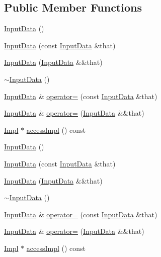 \subsection*{Public Member Functions}
\begin{DoxyCompactItemize}
\item 
\hyperlink{classMcCAD_1_1General_1_1InputData_a73842cb82b9c9992dee53ba766a5994c}{Input\+Data} ()
\item 
\hyperlink{classMcCAD_1_1General_1_1InputData_a1f1ffe8e5b1226b01da7916bdf5b59eb}{Input\+Data} (const \hyperlink{classMcCAD_1_1General_1_1InputData}{Input\+Data} \&that)
\item 
\hyperlink{classMcCAD_1_1General_1_1InputData_a04ef329c9eb848ce855faebb88f24f89}{Input\+Data} (\hyperlink{classMcCAD_1_1General_1_1InputData}{Input\+Data} \&\&that)
\item 
\hyperlink{classMcCAD_1_1General_1_1InputData_a11156f1c907e745d408926ebb09d3dd0}{$\sim$\+Input\+Data} ()
\item 
\hyperlink{classMcCAD_1_1General_1_1InputData}{Input\+Data} \& \hyperlink{classMcCAD_1_1General_1_1InputData_ae8cb358b1e230307dec893a5ec6490af}{operator=} (const \hyperlink{classMcCAD_1_1General_1_1InputData}{Input\+Data} \&that)
\item 
\hyperlink{classMcCAD_1_1General_1_1InputData}{Input\+Data} \& \hyperlink{classMcCAD_1_1General_1_1InputData_ac9d4a0a6caf1f89ed09ddbd700bcb6ae}{operator=} (\hyperlink{classMcCAD_1_1General_1_1InputData}{Input\+Data} \&\&that)
\item 
\hyperlink{classMcCAD_1_1General_1_1InputData_1_1Impl}{Impl} $\ast$ \hyperlink{classMcCAD_1_1General_1_1InputData_aefaf94de8ee1317c3db7f45da3e3b0ce}{access\+Impl} () const
\item 
\hyperlink{classMcCAD_1_1General_1_1InputData_a73842cb82b9c9992dee53ba766a5994c}{Input\+Data} ()
\item 
\hyperlink{classMcCAD_1_1General_1_1InputData_a1f1ffe8e5b1226b01da7916bdf5b59eb}{Input\+Data} (const \hyperlink{classMcCAD_1_1General_1_1InputData}{Input\+Data} \&that)
\item 
\hyperlink{classMcCAD_1_1General_1_1InputData_a04ef329c9eb848ce855faebb88f24f89}{Input\+Data} (\hyperlink{classMcCAD_1_1General_1_1InputData}{Input\+Data} \&\&that)
\item 
\hyperlink{classMcCAD_1_1General_1_1InputData_a11156f1c907e745d408926ebb09d3dd0}{$\sim$\+Input\+Data} ()
\item 
\hyperlink{classMcCAD_1_1General_1_1InputData}{Input\+Data} \& \hyperlink{classMcCAD_1_1General_1_1InputData_a19ffac929c6410bb768cc4a7630183b0}{operator=} (const \hyperlink{classMcCAD_1_1General_1_1InputData}{Input\+Data} \&that)
\item 
\hyperlink{classMcCAD_1_1General_1_1InputData}{Input\+Data} \& \hyperlink{classMcCAD_1_1General_1_1InputData_a4244ba00ba89c814c7607c4c7fd9fc91}{operator=} (\hyperlink{classMcCAD_1_1General_1_1InputData}{Input\+Data} \&\&that)
\item 
\hyperlink{classMcCAD_1_1General_1_1InputData_1_1Impl}{Impl} $\ast$ \hyperlink{classMcCAD_1_1General_1_1InputData_aeb2134f5c5d789ce81f1975a93c0e642}{access\+Impl} () const
\end{DoxyCompactItemize}

